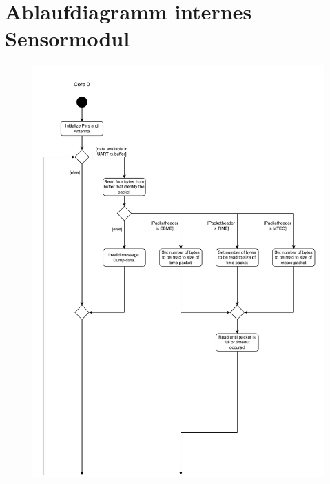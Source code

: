 \documentclass[a4paper,11pt]{article}
\begin{document}
\clearpage
\section{Ablaufdiagramm internes Sensormodul}

\begin{figure}[H]
  \centering
  \includegraphics[scale=0.75, page=1]{Ablauf intern.pdf}
\end{figure}
\end{document}
